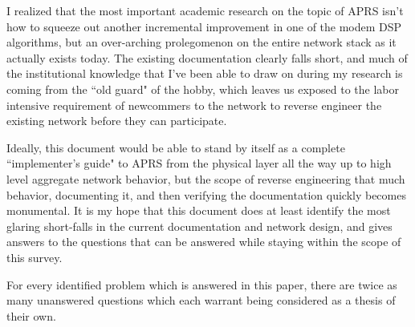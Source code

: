 I realized that the most important academic research on the topic of APRS isn't
how to squeeze out another incremental improvement in one of the modem DSP
algorithms, but an over-arching prolegomenon on the entire network stack as it 
actually exists today. The existing documentation clearly falls short, and 
much of the institutional knowledge that I've been able to draw on during 
my research is coming from the ``old guard" of the hobby, which leaves us exposed
to the labor intensive requirement of newcommers to the network to 
reverse engineer the existing network before they can participate.

Ideally, this document would be able to stand by itself as a complete 
``implementer's guide" to APRS from the physical layer all the way up to high level
aggregate network behavior, but the scope of reverse engineering that much
behavior, documenting it, and then verifying the documentation quickly becomes
monumental. 
It is my hope that this document does at least identify the most glaring 
short-falls in the current documentation and network design, and gives answers to
the questions that can be answered while staying within the scope of this survey.

For every identified problem which is answered in this paper, there
are twice as many unanswered questions which each warrant being considered 
as a thesis of their own.

